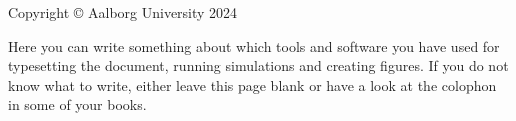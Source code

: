 \thispagestyle{empty}
{\small
\strut\vfill %
\noindent Copyright \copyright{} Aalborg University 2024\par
\vspace{0.2cm}
\noindent Here you can write something about which tools and software you have used for typesetting the document, running simulations and creating figures. If you do not know what to write, either leave this page blank or have a look at the colophon in some of your books.
}
\clearpage

